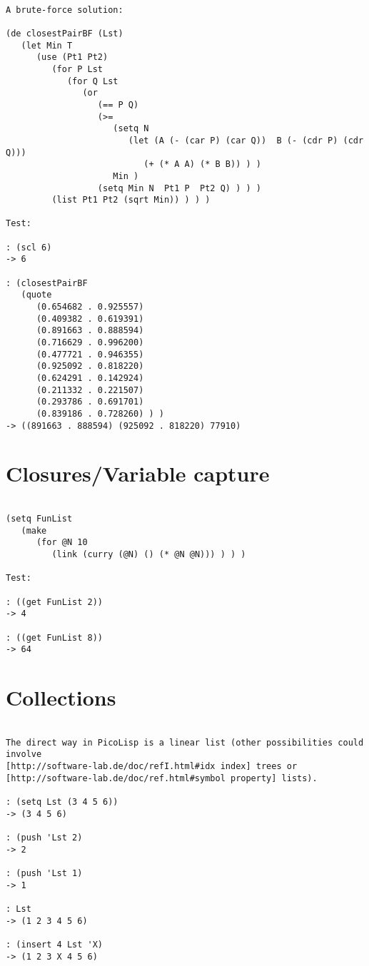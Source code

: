 \begin{verbatim}

A brute-force solution:

(de closestPairBF (Lst)
   (let Min T
      (use (Pt1 Pt2)
         (for P Lst
            (for Q Lst
               (or
                  (== P Q)
                  (>=
                     (setq N
                        (let (A (- (car P) (car Q))  B (- (cdr P) (cdr Q)))
                           (+ (* A A) (* B B)) ) )
                     Min )
                  (setq Min N  Pt1 P  Pt2 Q) ) ) )
         (list Pt1 Pt2 (sqrt Min)) ) ) )

Test:

: (scl 6)
-> 6

: (closestPairBF
   (quote
      (0.654682 . 0.925557)
      (0.409382 . 0.619391)
      (0.891663 . 0.888594)
      (0.716629 . 0.996200)
      (0.477721 . 0.946355)
      (0.925092 . 0.818220)
      (0.624291 . 0.142924)
      (0.211332 . 0.221507)
      (0.293786 . 0.691701)
      (0.839186 . 0.728260) ) )
-> ((891663 . 888594) (925092 . 818220) 77910)

\end{verbatim}

\section*{Closures/Variable capture}

\begin{verbatim}

(setq FunList
   (make
      (for @N 10
         (link (curry (@N) () (* @N @N))) ) ) )

Test:

: ((get FunList 2))
-> 4

: ((get FunList 8))
-> 64

\end{verbatim}

\section*{Collections}

\begin{verbatim}

The direct way in PicoLisp is a linear list (other possibilities could involve
[http://software-lab.de/doc/refI.html#idx index] trees or
[http://software-lab.de/doc/ref.html#symbol property] lists).

: (setq Lst (3 4 5 6))
-> (3 4 5 6)

: (push 'Lst 2)
-> 2

: (push 'Lst 1)
-> 1

: Lst
-> (1 2 3 4 5 6)

: (insert 4 Lst 'X)
-> (1 2 3 X 4 5 6)

\end{verbatim}

